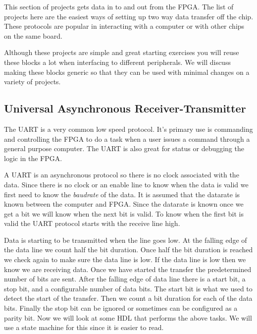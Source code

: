 This section of projects gets data in to and out from the \ac{FPGA}. The list of projects here are the easiest ways of setting up two way data transfer off the chip. These protocols are popular in interacting with a computer or with other chips on the same board.

Although these projects are simple and great starting exercises you will reuse these blocks a lot when interfacing to different peripherals. We will discuss making these blocks generic so that they can be used with minimal changes on a variety of projects.

\subsection{Universal Asynchronous Receiver-Transmitter}
	
The \ac{UART} is a very common low speed protocol. It's primary use is commanding and controlling the FPGA to do a task when a user issues a command through a general purpose computer. The \ac{UART} is also great for status or debugging the logic in the \ac{FPGA}.

A \ac{UART} is an asynchronous protocol so there is no clock associated with the data. Since there is no clock or an enable line to know when the data is valid we first need to know the \emph{baudrate} of the data. It is assumed that the datarate is known between the computer and \ac{FPGA}. Since the datarate is known once we get a bit we will know when the next bit is valid. To know when the first bit is valid the \ac{UART} protocol starts with the receive line high. 

Data is starting to be transmitted when the line goes low. At the falling edge of the data line we count half the bit duration. Once half the bit duration is reached we check again to make sure the data line is low. If the data line is low then we know we are receiving data. Once we have started the transfer the predetermined number of bits are sent. After the falling edge of data line there is a start bit, a stop bit, and a configurable number of data bits. The start bit is what we used to detect the start of the transfer. Then we count a bit duration for each of the data bits. Finally the stop bit can be ignored or sometimes can be configured as a parity bit.  Now we will look at some \ac{HDL} that performs the above tasks. We will use a state machine for this since it is easier to read. 
	
